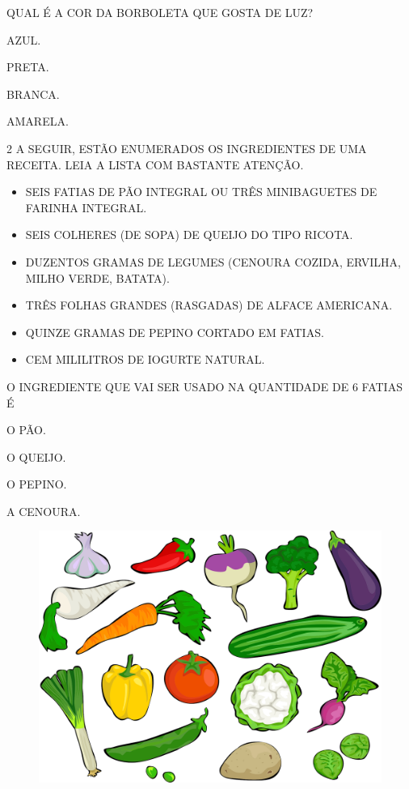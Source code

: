 QUAL É A COR DA BORBOLETA QUE GOSTA DE LUZ?

\begin{escolha}
\item
  AZUL.
\item
  PRETA.
\item
  BRANCA.
\item
  AMARELA.
\end{escolha}

\num{2} A SEGUIR, ESTÃO ENUMERADOS OS INGREDIENTES DE UMA RECEITA. LEIA A LISTA COM BASTANTE ATENÇÃO.

\begin{myquote}
\begin{itemize}
\item SEIS FATIAS DE PÃO INTEGRAL OU TRÊS MINIBAGUETES DE FARINHA INTEGRAL.
\item SEIS COLHERES (DE SOPA) DE QUEIJO DO TIPO RICOTA.
\item DUZENTOS GRAMAS DE LEGUMES (CENOURA COZIDA, ERVILHA, MILHO VERDE, BATATA).
\item TRÊS FOLHAS GRANDES (RASGADAS) DE ALFACE AMERICANA.
\item QUINZE GRAMAS DE PEPINO CORTADO EM FATIAS.
\item CEM MILILITROS DE IOGURTE NATURAL.
\end{itemize}
\end{myquote}

O INGREDIENTE QUE VAI SER USADO NA QUANTIDADE DE 6 FATIAS É

\begin{multicols}{2}
\begin{escolha}
\item O PÃO.

\item O QUEIJO.

\item O PEPINO.

\item A CENOURA.
\end{escolha}
\end{multicols}

\begin{figure}[H]
\centering
\includegraphics[width=.7\textwidth]{media/image263.png}
\end{figure}

